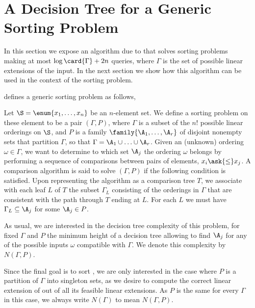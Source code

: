 \section{A Decision Tree for a Generic Sorting Problem}
\label{tree:xy:dt}

In this section we expose an algorithm due to \citet*{fredman:1976}
that solves sorting problems making at most $\log\card{\Gamma} + 2n$ queries,
where $\Gamma$ is the set of possible linear extensions of the input. In the
next section we show how this algorithm can be used in the context of the
sorting \XY problem.

\citet{fredman:1976} defines a generic sorting problem as follows,

\begin{problem}
Let $\S = \enum{x_1, \ldots, x_n}$ be an $n$-element set. We define a sorting
problem on these element to be a pair $(\Gamma, P)$, where $\Gamma$ is a
subset of the $n!$ possible linear orderings on $\S$, and
$P$ is a family $\family{\A_1, \ldots, \A_r}$ of disjoint nonempty sets that
partition $\Gamma$, so that $\Gamma = \A_1 \cup \ldots \cup \A_r$. Given an
(unknown) ordering $\omega \in \Gamma$, we want to determine to which set $\A_j$ the
ordering $\omega$ belongs by performing a sequence of comparisons between
pairs of elements, $x_i \ask{\le} x_j$. A comparison algorithm is said to
solve $(\Gamma, P)$ if the following condition is satisfied. Upon representing
the algorithm as a comparison tree $T$, we associate with each leaf $L$ of $T$
the subset $\Gamma_L$ consisting of the orderings in $\Gamma$ that are
consistent with the
path through $T$ ending at $L$. For each $L$ we must have $\Gamma_L \subseteq
\A_j$ for some $\A_j \in P$.
\end{problem}

As usual, we are interested in the decision tree complexity of this
problem, \ie for fixed \(\Gamma\) and \(P\) the minimum height of a decision
tree allowing to find \(\A_j\) for any of the possible inputs \(\omega\) compatible
with \(\Gamma\). We denote this complexity by $N(\Gamma, P)$.

Since the final goal is to sort \XY, we are only interested in the case
where $P$ is a partition of $\Gamma$ into singleton sets, as we desire to
compute the correct linear extension of \XY out of all its feasible linear
extensions. As $P$ is the same for every $\Gamma$ in this case, we
always write $N(\Gamma)$ to mean $N(\Gamma, P)$.

